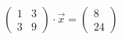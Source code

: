 \begin{bsp}
{$\begin{pmatrix} 1 & 3 \\ 3 & 9 \end{pmatrix} \cdot \vec{x} = \begin{pmatrix}
    8\\ 24
\end{pmatrix}$ }{}

\vspace*{12 cm}





\end{bsp}

\clearpage

